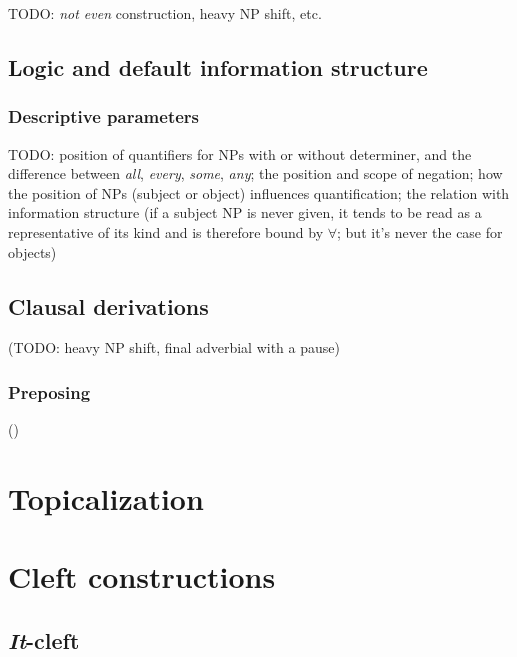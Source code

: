 \documentclass[UTF8, a4paper, oneside, scheme=plain, 12pt]{ctexbook}
\newcommand{\form}[1]{\emph{#1}}
\begin{document}
TODO: \form{not even} construction, heavy NP shift, etc.


\subsection{Logic and default information structure}

\subsubsection{Descriptive parameters}

TODO: position of quantifiers for NPs with or without determiner,
and the difference between \form{all}, \form{every}, \form{some}, \form{any};
the position and scope of negation;
how the position of NPs (subject or object) influences quantification;
the relation with information structure
(if a subject NP is never given, 
it tends to be read as a representative of its kind and is therefore bound by $\forall$;
but it's never the case for objects)

\subsection{Clausal derivations}\label{sec:simple-clause.derivation}

(TODO: heavy NP shift, final adverbial with a pause)

\subsubsection{Preposing}\label{sec:simple-clause.derivation.preposing}

()

\section{Topicalization}\label{sec:simple-clause.information.topicalization}

\section{Cleft constructions}

\subsection{\form{It}-cleft}
\end{document}
